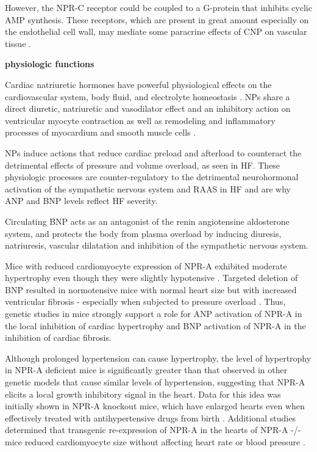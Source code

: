 \documentclass[14pt,a4paper,onecolumn]{extarticle}
\begin{document}
However, the NPR-C receptor could be coupled to a G-protein that inhibits cyclic AMP synthesis. These receptors, which are present in great amount especially on the endothelial cell wall, may mediate some paracrine effects of CNP on vascular tissue \citep{bib355}.

\textbf{physiologic functions}

Cardiac natriuretic hormones have powerful physiological effects on the cardiovascular system, body fluid, and electrolyte homeostasis \citep{bib35}. NPs share a direct diuretic, natriuretic and vasodilator effect and an inhibitory action on ventricular myocyte contraction \citep{79} as well as remodeling and inflammatory processes of myocardium and smooth muscle cells \citep{83}.

NPs induce actions that reduce cardiac preload and afterload to counteract the detrimental effects of pressure and volume overload, as seen in HF.  These physiologic processes are counter-regulatory to the detrimental neurohormonal activation of the sympathetic nervous system and RAAS in HF and are why ANP and BNP levels reflect HF severity. \citep{Potter2011} %

Circulating BNP acts as an antagonist of the renin angiotensine aldosterone system, and protects the body from plasma overload by inducing diuresis, natriuresis, vascular dilatation and inhibition of the sympathetic nervous system. \citep{Hall2005}


Mice with reduced cardiomyocyte expression of NPR-A exhibited moderate hypertrophy even though they were slightly hypotensive \citep{Holtwick2003} \citep{Patel2005}. Targeted deletion of BNP resulted in normotensive mice with normal heart size but with increased ventricular fibrosis - especially when subjected to pressure overload \citep{Tamura2000}. Thus, genetic studies in mice strongly support a role for ANP activation of NPR-A in the local inhibition of cardiac hypertrophy and BNP activation of NPR-A in the inhibition of cardiac fibrosis. %

Although prolonged hypertension can cause hypertrophy, the level of hypertrophy in NPR-A deficient mice is significantly greater than that observed in other genetic models that cause similar levels of hypertension, suggesting that NPR-A elicits a local growth inhibitory signal in the heart. Data for this idea was initially shown in NPR-A knockout mice, which have enlarged hearts even when effectively treated with antihypertensive drugs from birth \citep{Knowles2001}. Additional studies determined that transgenic re-expression of NPR-A in the hearts of NPR-A -/- mice reduced cardiomyocyte size without affecting heart rate or blood pressure \citep{Kishimoto2001}. %
\end{document}
